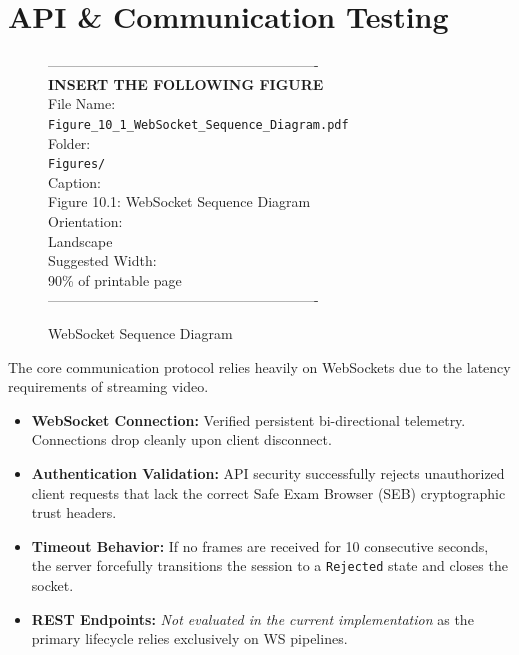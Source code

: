 \documentclass[12pt, a4paper]{report}
\begin{document}
\section{API \& Communication Testing}
\begin{figure}[htbp]
\begin{center}
----------------------------------------------------------\\
\vspace{0.5em}
\textbf{INSERT THE FOLLOWING FIGURE}\\
\vspace{1em}
File Name:\\
\texttt{Figure\_10\_1\_WebSocket\_Sequence\_Diagram.pdf}\\
\vspace{1em}
Folder:\\
\texttt{Figures/}\\
\vspace{1em}
Caption:\\
Figure 10.1: WebSocket Sequence Diagram\\
\vspace{1em}
Orientation:\\
Landscape\\
\vspace{1em}
Suggested Width:\\
90\% of printable page\\
\vspace{3cm}
----------------------------------------------------------
\end{center}
\caption{WebSocket Sequence Diagram}
\label{fig:diag_7}
\end{figure}
The core communication protocol relies heavily on WebSockets due to the latency requirements of streaming video.
\begin{itemize}
    \item \textbf{WebSocket Connection:} Verified persistent bi-directional telemetry. Connections drop cleanly upon client disconnect.
    \item \textbf{Authentication Validation:} API security successfully rejects unauthorized client requests that lack the correct Safe Exam Browser (SEB) cryptographic trust headers.
    \item \textbf{Timeout Behavior:} If no frames are received for 10 consecutive seconds, the server forcefully transitions the session to a \texttt{Rejected} state and closes the socket.
    \item \textbf{REST Endpoints:} \textit{Not evaluated in the current implementation} as the primary lifecycle relies exclusively on WS pipelines.
\end{itemize}
\end{document}
